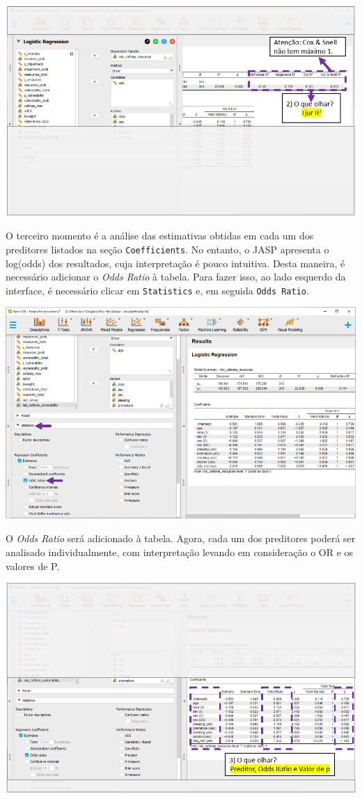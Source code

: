 \documentclass[
]{book}
\begin{document}
\includegraphics{./img/cap_logistica_resultado_2.png}

O terceiro momento é a análise das estimativas obtidas em cada um dos preditores listados na seção \texttt{Coefficients}. No entanto, o JASP apresenta o log(odds) dos resultados, cuja interpretação é pouco intuitiva. Desta maneira, é necessário adicionar o \emph{Odds Ratio} à tabela. Para fazer isso, ao lado esquerdo da interface, é necessário clicar em \texttt{Statistics} e, em seguida \texttt{Odds\ Ratio}.

\includegraphics{./img/cap_logistica_resultado_3.png}

O \emph{Odds Ratio} será adicionado à tabela. Agora, cada um dos preditores poderá ser analisado individualmente, com interpretação levando em consideração o OR e os valores de P.

\includegraphics{./img/cap_logistica_resultado_4.png}
\end{document}
